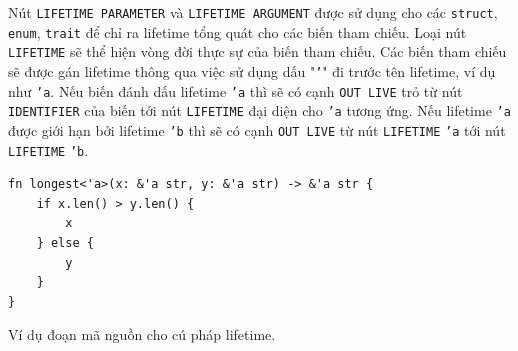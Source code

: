 Nút \texttt{LIFETIME PARAMETER} và \texttt{LIFETIME ARGUMENT} được sử dụng cho các \texttt{struct}, \texttt{enum}, \texttt{trait} để chỉ ra lifetime tổng quát cho các biến tham chiếu.
Loại nút \texttt{LIFETIME} sẽ thể hiện vòng đời thực sự của biến tham chiếu.
Các biến tham chiếu sẽ được gán lifetime thông qua việc sử dụng dấu "\texttt{'}" đi trước tên lifetime, ví dụ như \texttt{'a}.
Nếu biến đánh dấu lifetime \texttt{'a} thì sẽ có cạnh \texttt{OUT LIVE} trỏ từ nút \texttt{IDENTIFIER} của biến tới nút \texttt{LIFETIME} đại diện cho \texttt{'a} tương ứng.
Nếu lifetime \texttt{'a} được giới hạn bởi lifetime \texttt{'b} thì sẽ có cạnh \texttt{OUT LIVE} từ nút \texttt{LIFETIME} \texttt{'a} tới nút \texttt{LIFETIME} \texttt{'b}.


\begin{listing}[H]
\begin{verbatim}
fn longest<'a>(x: &'a str, y: &'a str) -> &'a str {
    if x.len() > y.len() {
        x
    } else {
        y
    }
}
\end{verbatim}
\caption{Ví dụ đoạn mã nguồn cho cú pháp lifetime.}
\label{code:c4_lifetime_1}
\end{listing}

